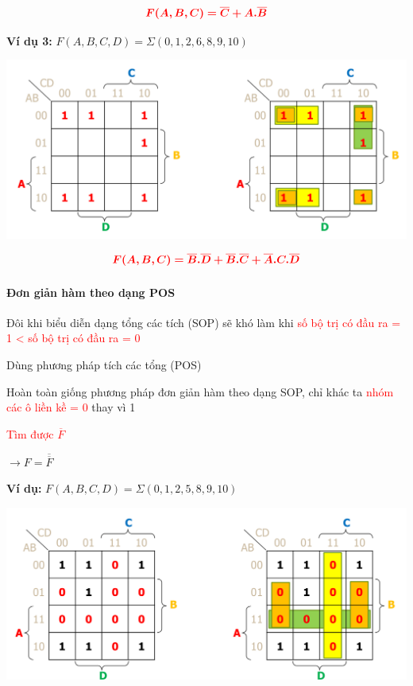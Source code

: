 \documentclass[12pt]{article}
\newcommand{\SubItem}[1]{
    {\setlength\itemindent{15pt} \item[-] #1}
}
\begin{document}
\begin{sloppypar}
\begin{equation*}
    \color{red}
    \bm{F(A,B,C) = \overline{C} + A.\overline{B}}
\end{equation*}

\begin{tcolorbox}
    \textbf{Ví dụ 3:} \(F(A,B,C,D) = \Sigma(0,1,2,6,8,9,10)\)
\end{tcolorbox}

\includegraphics[width=15cm]{sop_ex3.png}

\begin{equation*}
    \color{red}
    \bm{F(A,B,C) = \overline{B}.\overline{D} + \overline{B}.\overline{C} + \overline{A}.C.\overline{D}}
\end{equation*}

\paragraph{Đơn giản hàm theo dạng POS}

\begin{itemize}
    \item Đôi khi biểu diễn dạng tổng các tích (SOP) sẽ khó làm khi \textcolor{red}{số bộ trị có đầu ra = 1 < số bộ trị có đầu ra = 0}
        \SubItem {Dùng phương pháp tích các tổng (POS)}
    \item Hoàn toàn giống phương pháp đơn giản hàm theo dạng SOP, chỉ khác ta \textcolor{red}{nhóm các ô liền kề = 0} thay vì 1
        \SubItem {\textcolor{red}{Tìm được \(\overline{F}\)}}
        \SubItem{\color{red}\(\rightarrow F = \overline{\overline{F}}\)}
\end{itemize}

\begin{tcolorbox}
    \textbf{Ví dụ:} \(F(A,B,C,D) = \Sigma(0,1,2,5,8,9,10)\)
\end{tcolorbox}

\includegraphics[width=15cm]{pos_ex.png}


\end{sloppypar}
\end{document}
